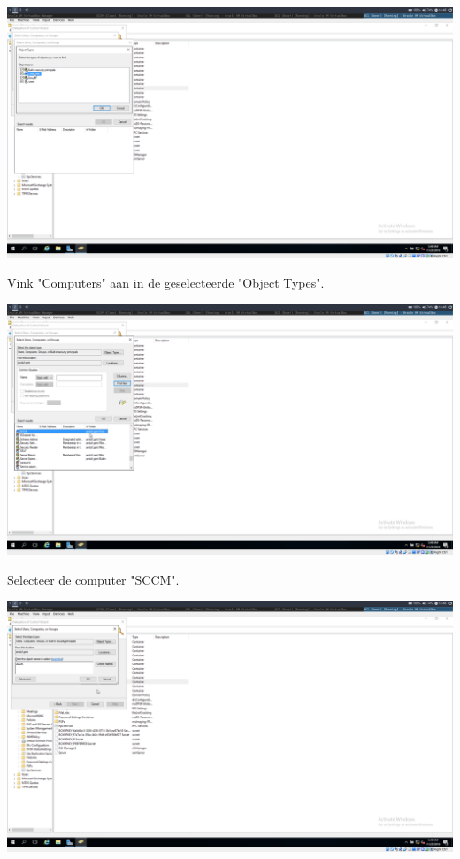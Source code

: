 \documentclass[a4paper]{article}
\begin{document}
\begin{center}
	\includegraphics[width=15cm]{Pictures/SCCM/1/1543499322.png}
	
	Vink "Computers" aan in de geselecteerde "Object Types".
\end{center}
\begin{center}
	\includegraphics[width=15cm]{Pictures/SCCM/1/1543499331.png}
	
	Selecteer de computer "SCCM".
\end{center}
\begin{center}
	\includegraphics[width=15cm]{Pictures/SCCM/1/1543499333.png}


\end{center}
\end{document}
